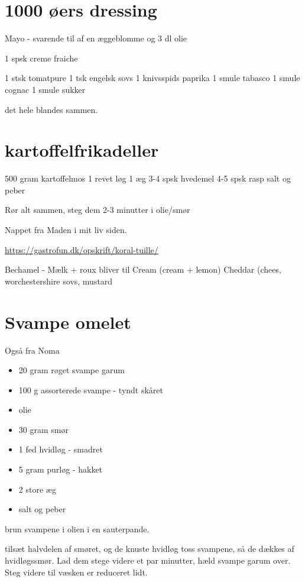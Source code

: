 \documentclass[
]{book}
\providecommand{\tightlist}{%
  \setlength{\itemsep}{0pt}\setlength{\parskip}{0pt}}
\begin{document}
\section{1000 øers dressing}\label{uxf8ers-dressing}

Mayo - svarende til af en æggeblomme og 3 dl olie

1 spsk creme fraiche

1 stsk tomatpure
1 tsk engelsk sovs
1 knivsspids paprika
1 smule tabasco
1 smule cognac
1 smule sukker

det hele blandes sammen.

\section{kartoffelfrikadeller}\label{kartoffelfrikadeller}

500 gram kartoffelmos
1 revet løg
1 æg
3-4 spsk hvedemel
4-5 spsk rasp
salt og peber

Rør alt sammen, steg dem 2-3 minutter i olie/smør

Nappet fra Maden i mit liv siden.

\url{https://gastrofun.dk/opskrift/koral-tuille/}

Bechamel - Mælk + roux
bliver til
Cream (cream + lemon)
Cheddar (chees, worchestershire sovs, mustard

\section{Svampe omelet}\label{svampe-omelet}

Også fra Noma

\begin{itemize}
\tightlist
\item
  20 gram røget svampe garum
\item
  100 g assorterede svampe - tyndt skåret
\item
  olie
\item
  30 gram smør
\item
  1 fed hvidløg - smadret
\item
  5 gram purløg - hakket
\item
  2 store æg
\item
  salt og peber
\end{itemize}

brun svampene i olien i en sauterpande.

tilsæt halvdelen af smøret, og de knuste hvidløg
toss svampene, så de dækkes af hvidløgssmør.
Lad dem stege videre et par minutter, hæld svampe garum over. Steg videre til væsken er reduceret lidt.
\end{document}
